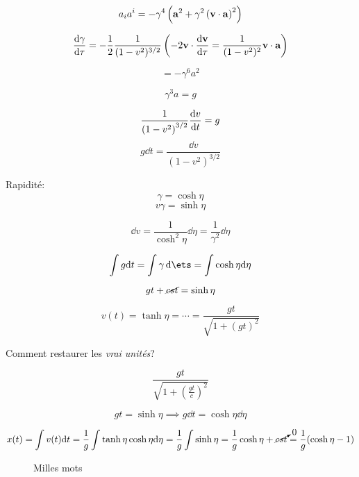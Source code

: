 $$a_i a^{i}= -\gamma^{4} \left( \vb{a}^2 + \gamma^{2}\left( \vb{v}\cdot \vb{a} \right)^2 \right) $$ 


\begin{tcolorbox}[title=]
	$$\dv{\gamma}{\tau} = -\frac{1}{2} \frac{1}{(1-v^2)^{3/2}} \left( -2 \vb{v} \cdot \dv{\vb{v}}{\tau}  = \frac{1}{(1-v^2)^2} \vb{v}\cdot \vb{a}  \right)  $$ 
\end{tcolorbox}

$$=-\gamma^{6}a^2$$ 


$$\gamma^{3}a=g$$ 

$$\frac{1}{\qty(1-v^2)^{3/2}} \dv{v}{t} =g $$ 
$$g \dd t = \frac{\dd{}v}{(1-v^2)^{3/2}} $$ 

Rapidité:
$$\gamma = \cosh \eta$$ 
$$v\gamma = \sinh\eta$$ 

$$\dd v = \frac{1}{\cosh^2\eta} \dd \eta = \frac{1}{\gamma^{2}} \dd \eta $$ 

$$\int g \dd t = \int \gamma \dd \ets = \int \cosh\eta \dd \eta $$ 

$$gt + \cancel{cst} = \sinh\eta$$ 



$$v(t) = \tanh\eta =\dotsb= \frac{gt}{\sqrt{1+(gt)^2}} $$ 

Comment restaurer les \textit{vrai unités}?

$$\frac{gt}{\sqrt{1 + \left( \frac{gt}{c}  \right)^2}} $$ 


\begin{tcolorbox}[title=]
	 $$gt = \sinh\eta \implies g \dd t = \cosh\eta \dd \eta$$
\end{tcolorbox}


$$x(t)= \int v(t) \dd t = \frac{1}{g} \int\tanh\eta\cosh\eta\dd\eta = \frac{1}{g} \int\sinh\eta = \frac{1}{g} \cosh\eta + \cancelto{0}{cst} = \frac{1}{g}(\cosh\eta -1)$$ 

\clearpage 
{}


\begin{figure}[ht]
    \centering
    \caption{Milles mots}
    \label{fig:milles-mots}
\end{figure}






